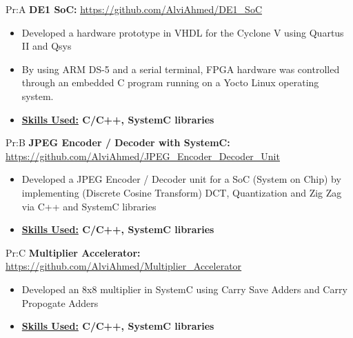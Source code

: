 Pr:A
\textbf{DE1 SoC: } \underline{\url{https://github.com/AlviAhmed/DE1_SoC}}
\begin{itemize}[noitemsep,nolistsep]
\item Developed a hardware prototype in VHDL for the Cyclone V using Quartus II and Qsys
\item By using ARM DS-5 and a serial terminal, FPGA hardware was controlled through an embedded C program running on a Yocto Linux operating system.
\item \textbf{\underline{Skills Used:} C/C++, SystemC libraries}
\end{itemize}


Pr:B
\textbf{JPEG Encoder / Decoder with SystemC: }
\underline{\url{https://github.com/AlviAhmed/JPEG_Encoder_Decoder_Unit}}
\begin{itemize}[noitemsep,nolistsep]
\item Developed a JPEG Encoder / Decoder unit for a SoC (System on Chip) by implementing
  (Discrete Cosine Transform) DCT, Quantization and Zig Zag via C++ and SystemC libraries
\item \textbf{\underline{Skills Used:} C/C++, SystemC libraries}
\end{itemize}


Pr:C
\textbf{Multiplier Accelerator: }
\underline{\url{https://github.com/AlviAhmed/Multiplier_Accelerator}}
\begin{itemize}[noitemsep,nolistsep]
\item Developed an 8x8 multiplier in SystemC using Carry Save Adders and Carry Propogate Adders
\item \textbf{\underline{Skills Used:} C/C++, SystemC libraries}
\end{itemize}


